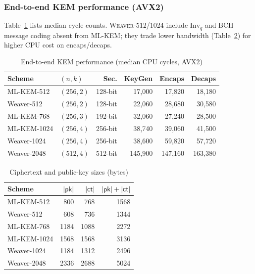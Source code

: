 \subsubsection{End-to-end KEM performance (AVX2)}
Table~\ref{tab:kem_avx} lists median cycle counts. \textsc{Weaver-512/1024} include $\mathrm{Inv}_q$ and BCH message coding absent from ML-KEM; they trade lower bandwidth (Table~\ref{tab:bandwidth}) for higher CPU cost on encaps/decaps.

\begin{table}[t]
\centering
\caption{End-to-end KEM performance (median CPU cycles, AVX2)}
\label{tab:kem_avx}
\renewcommand{\arraystretch}{1.15}
\begin{tabular}{llrrrr}
\toprule
\textbf{Scheme} & $(n,k)$ & \textbf{Sec.} & \textbf{KeyGen} & \textbf{Encaps} & \textbf{Decaps} \\
\midrule
ML-KEM-512   & $(256,2)$ & 128-bit & 17{,}000 & 17{,}820 & 18{,}180 \\
Weaver-512   & $(256,2)$ & 128-bit & 22{,}060 & 28{,}680 & 30{,}580 \\
\midrule
ML-KEM-768   & $(256,3)$ & 192-bit & 32{,}060 & 27{,}240 & 28{,}500 \\
ML-KEM-1024  & $(256,4)$ & 256-bit & 38{,}740 & 39{,}060 & 41{,}500 \\
Weaver-1024  & $(256,4)$ & 256-bit & 38{,}600 & 59{,}820 & 57{,}720 \\
\midrule
Weaver-2048  & $(512,4)$ & 512-bit & 145{,}900 & 147{,}160 & 163{,}380 \\
\bottomrule
\end{tabular}
\end{table}

\begin{table}[t]
\centering
\caption{Ciphertext and public-key sizes (bytes)}
\label{tab:bandwidth}
\begin{tabular}{lrrr}
\toprule
\textbf{Scheme} & $|\mathsf{pk}|$ & $|\mathsf{ct}|$ & $|\mathsf{pk}|+|\mathsf{ct}|$ \\
\midrule
ML-KEM-512   & 800  & 768  & 1568 \\
Weaver-512   & 608  & 736  & 1344 \\
ML-KEM-768   & 1184 & 1088 & 2272 \\
ML-KEM-1024  & 1568 & 1568 & 3136 \\
Weaver-1024  & 1184 & 1312 & 2496 \\
Weaver-2048  & 2336 & 2688 & 5024 \\
\bottomrule
\end{tabular}
\end{table}

